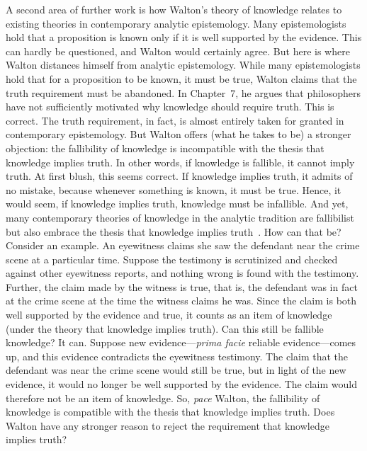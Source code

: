 \documentclass[12pt,a4paper]{article}
\begin{document}
A second area of further work is how Walton's theory of knowledge relates to existing theories 
in contemporary analytic epistemology. 
Many epistemologists hold that a proposition is known 
only if it is well supported by the evidence. This can hardly be questioned, 
and Walton would certainly agree. 
But here is where Walton distances himself 
from analytic epistemology. 
While many epistemologists hold that 
for a proposition to be known, it must be true, Walton claims that the truth requirement 
must be abandoned. In Chapter~7, he argues that philosophers have not sufficiently motivated why knowledge 
should require truth. This is correct. The truth requirement, in fact, is almost 
entirely taken for granted in contemporary epistemology. But Walton offers 
(what he takes to be) a stronger objection: the fallibility of knowledge is incompatible with 
the thesis that knowledge implies truth. 
In other words, if knowledge is fallible, 
it cannot imply truth. At first blush, this seems correct. If knowledge implies truth, it admits of no mistake, because whenever 
something is known, it must be true. 
Hence, it would seem, if knowledge implies truth, knowledge must be infallible. 
And yet, many contemporary theories of knowledge in the analytic tradition are fallibilist 
but also embrace the thesis that knowledge implies truth~\citep{ichikawaSteup2012,steup2005,pollock1986}. 
How can that be? 
Consider an example. 
An eyewitness claims she saw the defendant near the crime scene at a particular time.
Suppose the testimony is scrutinized and checked against other eyewitness reports, and nothing 
wrong is found with the testimony.
Further, the claim made by the witness is true, that is, the defendant was in fact at the crime scene 
at the time the witness claims he was. Since the claim is both well supported by the evidence and true, 
it counts as an item of knowledge (under the theory that knowledge implies truth). 
Can this still be fallible knowledge? It can. 
Suppose new evidence---\textit{prima facie} reliable evidence---comes up, and this evidence 
contradicts the eyewitness testimony. The claim that the defendant was near the crime scene would still 
be true, but in light of the new evidence, it would no longer be well supported by the evidence. The 
claim would therefore not be an item of knowledge. 
So, \textit{pace} %
Walton, the fallibility of knowledge is compatible with 
the thesis that knowledge implies truth. Does Walton have any stronger reason 
to reject the requirement that knowledge implies truth?
\end{document}
